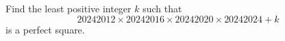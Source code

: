 Find the least positive integer $k$ such that \[20242012 \times 20242016 \times 20242020 \times  20242024 + k\]is a perfect square.
